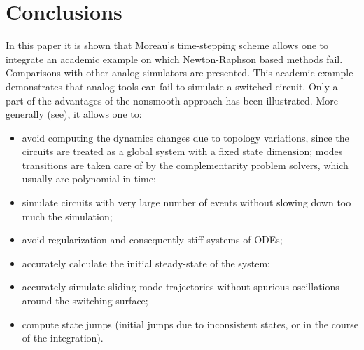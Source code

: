 \section{Conclusions}
\label{section5}
{\color{navyblue}
In this paper it is  shown that Moreau's time-stepping scheme allows one to integrate an academic example on which Newton-Raphson based methods fail.  Comparisons with other analog simulators are presented.  This academic example demonstrates that analog tools can fail to simulate a switched circuit.
 Only a part of the advantages of the nonsmooth approach has been illustrated. More generally (see\cite{Acary.ea_RR2009}), it allows one to:
\begin{itemize}
\item avoid computing the dynamics changes due to topology variations, since the circuits are treated as a global system with a fixed state dimension; modes transitions are taken care of by the complementarity problem solvers, which usually are polynomial in time;
\item simulate circuits with very large number of events without slowing down too much the simulation;
\item avoid regularization and consequently stiff systems of ODEs;
\item accurately calculate the initial steady-state of the system;
\item accurately simulate sliding mode trajectories without spurious oscillations around the switching surface;
\item compute state jumps (initial jumps due to inconsistent states, or in the course of the integration). 
\end{itemize}
 
}



